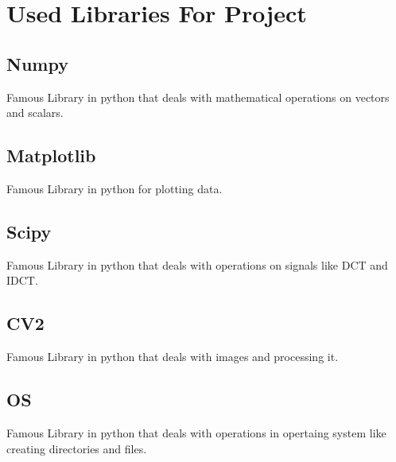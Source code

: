 \chapter{Used Libraries For Project}
\section{Numpy}
Famous Library in python that deals with mathematical operations on vectors and scalars.
\section{Matplotlib}
Famous Library in python for plotting data.
\section{Scipy}
Famous Library in python that deals with operations on signals like DCT and IDCT.
\section{CV2}
Famous Library in python that deals with images and processing it.
\section{OS}
Famous Library in python that deals with operations in opertaing system like creating directories and files.
\\[50pt]
